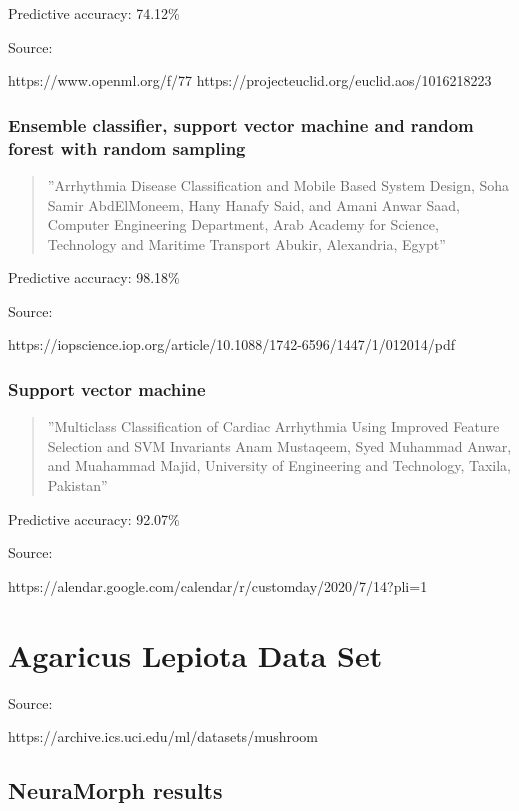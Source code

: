 \documentclass[8pt, a4paper]{article}
\begin{document}
Predictive accuracy: 74.12\%

Source:

https://www.openml.org/f/77
https://projecteuclid.org/euclid.aos/1016218223

\subsubsection{Ensemble classifier, support vector machine and random forest with random sampling}

\begin{quote}
''Arrhythmia Disease Classification and Mobile Based System
Design, Soha Samir AbdElMoneem, Hany Hanafy Said, and Amani Anwar Saad, Computer Engineering Department, Arab Academy for Science, Technology and
Maritime Transport Abukir, Alexandria, Egypt''
\end{quote}

Predictive accuracy: 98.18\%

Source:

https://iopscience.iop.org/article/10.1088/1742-6596/1447/1/012014/pdf

\subsubsection{Support vector machine}

\begin{quote}
''Multiclass Classification of Cardiac Arrhythmia Using Improved Feature Selection and SVM Invariants Anam Mustaqeem, Syed Muhammad Anwar, and Muahammad Majid, University of Engineering and Technology, Taxila, Pakistan''
\end{quote}

Predictive accuracy: 92.07\%

Source:

https://alendar.google.com/calendar/r/customday/2020/7/14?pli=1




\newpage
\section{Agaricus Lepiota Data Set}

Source: 

https://archive.ics.uci.edu/ml/datasets/mushroom

\subsection{NeuraMorph results}
\end{document}
